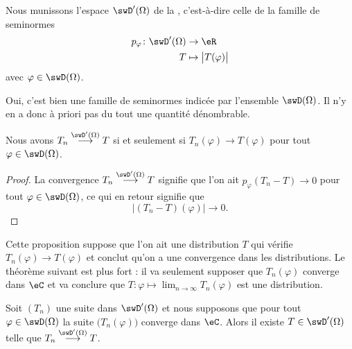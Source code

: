 \begin{definition}        \label{DefASmjVaT}
    Nous munissons l'espace \( \swD'(\Omega)\) de la , c'est-à-dire celle de la famille de seminormes
    \begin{equation}
        \begin{aligned}
            p_{\varphi}\colon \swD'(\Omega)&\to \eR \\
            T&\mapsto \big| T(\varphi) \big|
        \end{aligned}
    \end{equation}
    avec \( \varphi\in\swD(\Omega)\).
\end{definition}
Oui, c'est bien une famille de seminormes indicée par l'ensemble \( \swD(\Omega)\). Il n'y en a donc à priori pas du tout une quantité dénombrable.

\begin{proposition}  \label{PropEUIsNhD}
    Nous avons \( T_n\stackrel{\swD'(\Omega)}{\longrightarrow}T\) si et seulement si \( T_n(\varphi)\to T(\varphi)\) pour tout \( \varphi\in\swD(\Omega)\).
\end{proposition}

\begin{proof}
    La convergence \( T_n\stackrel{\swD'(\Omega)}{\longrightarrow}T\) signifie que l'on ait \( p_{\varphi}(T_n-T)\to 0\) pour tout \( \varphi\in\swD(\Omega)\), ce qui en retour signifie que
    \begin{equation}
        \big| (T_n-T)(\varphi) \big|\to 0.
    \end{equation}
\end{proof}
Cette proposition suppose que l'on ait une distribution \( T\) qui vérifie \( T_n(\varphi)\to T(\varphi)\) et conclut qu'on a une convergence dans les distributions. Le théorème suivant est plus fort : il va seulement supposer que \( T_n(\varphi)\) converge dans \( \eC\) et va conclure que \( T\colon \varphi\mapsto \lim_{n\to \infty} T_n(\varphi)\) est une distribution.

\begin{theorem}
    Soit \( (T_n)\) une suite dans \( \swD'(\Omega)\) et nous supposons que pour tout \( \varphi\in\swD(\Omega)\) la suite \( \big( T_n(\varphi) \big)\) converge dans \( \eC\). Alors il existe \( T\in\swD'(\Omega)\) telle que \( T_n\stackrel{\swD'(\Omega)}{\longrightarrow}T\).
\end{theorem}


